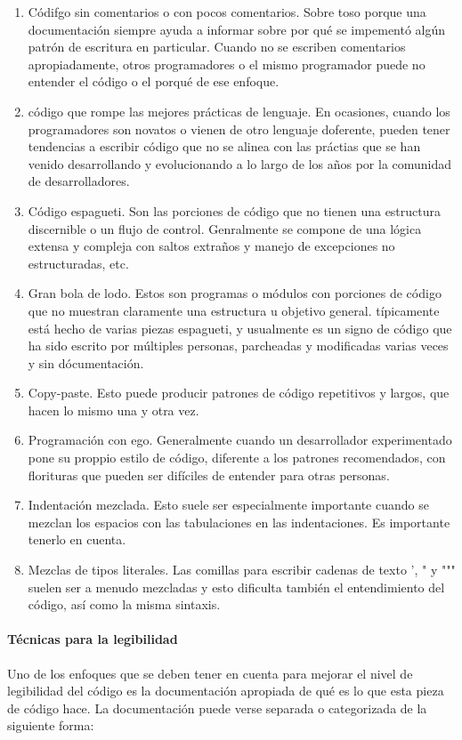 \begin{enumerate}
    \item Códifgo sin comentarios o con pocos comentarios. Sobre toso porque una documentación siempre ayuda a informar sobre por qué se impementó algún patrón de escritura en particular. Cuando no se escriben comentarios apropiadamente, otros programadores o el mismo programador puede no entender el código o el porqué de ese enfoque.
    \item código que rompe las mejores prácticas de lenguaje. En ocasiones, cuando los programadores son novatos o vienen de otro lenguaje doferente, pueden tener tendencias a escribir código que no se alinea con las práctias que se han venido desarrollando y evolucionando a lo largo de los años por la comunidad de desarrolladores.
    \item Código espagueti. Son las porciones de código que no tienen una estructura discernible o un flujo de control. Genralmente se compone de una lógica extensa y compleja con saltos extraños y manejo de excepciones no estructuradas, etc.
    \item Gran bola de lodo. Estos son programas o módulos con porciones de código que no muestran claramente una estructura u objetivo general. típicamente está hecho de varias piezas espagueti, y usualmente es un signo de código que ha sido escrito por múltiples personas, parcheadas y modificadas varias veces y sin dócumentación. 
    \item Copy-paste. Esto puede producir patrones de código repetitivos y largos, que hacen lo mismo una y otra vez.
    \item Programación con ego. Generalmente cuando un desarrollador experimentado pone su proppio estilo de código, diferente a los patrones recomendados, con florituras que pueden ser difíciles de entender para otras personas.
    \item Indentación mezclada. Esto suele ser especialmente importante cuando se mezclan los espacios con las tabulaciones en las indentaciones. Es importante tenerlo en cuenta.
    \item Mezclas de tipos literales. Las comillas para escribir cadenas de texto ’, " y """ suelen ser a menudo mezcladas y esto dificulta también el entendimiento del código, así como la misma sintaxis.
\end{enumerate}

\paragraph{Técnicas para la legibilidad} Uno de los enfoques que se deben tener en cuenta para mejorar el nivel de legibilidad del código es la documentación apropiada de qué es lo que esta pieza de código hace. La documentación puede verse separada o categorizada de la siguiente forma:

